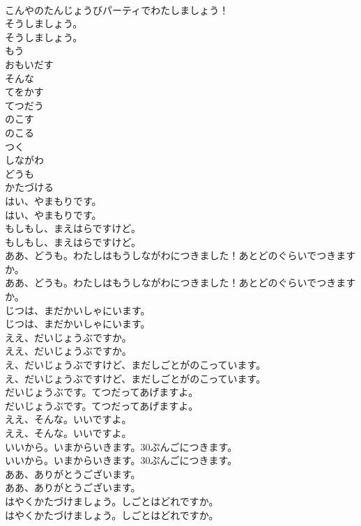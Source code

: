 \documentclass[8pt]{extreport}
\begin{document}
\begin{CJK}{UTF8}{min}
\\	こんやのたんじょうびパーティでわたしましょう！ 
\\	そうしましょう。	
\\	そうしましょう。 
\\	もう
\\	おもいだす
\\	そんな
\\	てをかす
\\	てつだう
\\	のこす
\\	のこる
\\	つく
\\	しながわ
\\	どうも
\\	かたづける
\\	はい、やまもりです。	
\\	はい、やまもりです。 
\\	もしもし、まえはらですけど。	
\\	もしもし、まえはらですけど。 
\\	ああ、どうも。わたしはもうしながわにつきました！あとどのぐらいでつきますか。	
\\	ああ、どうも。わたしはもうしながわにつきました！あとどのぐらいでつきますか。 
\\	じつは、まだかいしゃにいます。	
\\	じつは、まだかいしゃにいます。 
\\	ええ、だいじょうぶですか。	
\\	ええ、だいじょうぶですか。 
\\	え、だいじょうぶですけど、まだしごとがのこっています。	
\\	え、だいじょうぶですけど、まだしごとがのこっています。 
\\	だいじょうぶです。てつだってあげますよ。	
\\	だいじょうぶです。てつだってあげますよ。 
\\	ええ、そんな。いいですよ。	
\\	ええ、そんな。いいですよ。 
\\	いいから。いまからいきます。30ぷんごにつきます。	
\\	いいから。いまからいきます。30ぷんごにつきます。 
\\	ああ、ありがとうございます。	
\\	ああ、ありがとうございます。 
\\	はやくかたづけましょう。しごとはどれですか。	
\\	はやくかたづけましょう。しごとはどれですか。 

\end{CJK}
\end{document}
